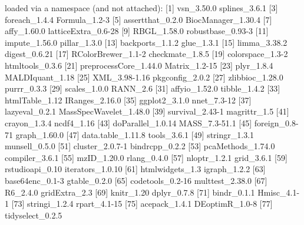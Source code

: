 \documentclass[a4paper,11pt]{article}
\begin{document}
\begin{Schunk}
\begin{Soutput}
loaded via a namespace (and not attached):
 [1] vsn_3.50.0             splines_3.6.1         
 [3] foreach_1.4.4          Formula_1.2-3         
 [5] assertthat_0.2.0       BiocManager_1.30.4    
 [7] affy_1.60.0            latticeExtra_0.6-28   
 [9] RBGL_1.58.0            robustbase_0.93-3     
[11] impute_1.56.0          pillar_1.3.0          
[13] backports_1.1.2        glue_1.3.1            
[15] limma_3.38.2           digest_0.6.21         
[17] RColorBrewer_1.1-2     checkmate_1.8.5       
[19] colorspace_1.3-2       htmltools_0.3.6       
[21] preprocessCore_1.44.0  Matrix_1.2-15         
[23] plyr_1.8.4             MALDIquant_1.18       
[25] XML_3.98-1.16          pkgconfig_2.0.2       
[27] zlibbioc_1.28.0        purrr_0.3.3           
[29] scales_1.0.0           RANN_2.6              
[31] affyio_1.52.0          tibble_1.4.2          
[33] htmlTable_1.12         IRanges_2.16.0        
[35] ggplot2_3.1.0          nnet_7.3-12           
[37] lazyeval_0.2.1         MassSpecWavelet_1.48.0
[39] survival_2.43-1        magrittr_1.5          
[41] crayon_1.3.4           ncdf4_1.16            
[43] doParallel_1.0.14      MASS_7.3-51.1         
[45] foreign_0.8-71         graph_1.60.0          
[47] data.table_1.11.8      tools_3.6.1           
[49] stringr_1.3.1          munsell_0.5.0         
[51] cluster_2.0.7-1        bindrcpp_0.2.2        
[53] pcaMethods_1.74.0      compiler_3.6.1        
[55] mzID_1.20.0            rlang_0.4.0           
[57] nloptr_1.2.1           grid_3.6.1            
[59] rstudioapi_0.10        iterators_1.0.10      
[61] htmlwidgets_1.3        igraph_1.2.2          
[63] base64enc_0.1-3        gtable_0.2.0          
[65] codetools_0.2-16       multtest_2.38.0       
[67] R6_2.4.0               gridExtra_2.3         
[69] knitr_1.20             dplyr_0.7.8           
[71] bindr_0.1.1            Hmisc_4.1-1           
[73] stringi_1.2.4          rpart_4.1-15          
[75] acepack_1.4.1          DEoptimR_1.0-8        
[77] tidyselect_0.2.5      
\end{Soutput}
\end{Schunk}
\end{document}
